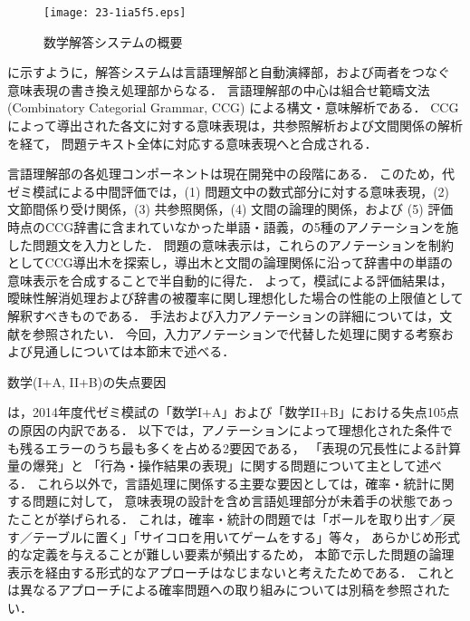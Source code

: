 \documentclass[japanese]{jnlp_1.4b}
\def\FIGREF#1{}
\def\TABREF#1{}
\begin{document}
\begin{figure}[b]
\begin{center}
\texttt{[image: 23-1ia5f5.eps]}
\end{center}
\caption{数学解答システムの概要\label{fig:mathoverview}}
\end{figure}

\FIGREF{fig:mathoverview}に示すように，解答システムは言語理解部と自動演繹部，および両者をつなぐ
意味表現の書き換え処理部からなる．
言語理解部の中心は組合せ範疇文法 (Combinatory Categorial Grammar, CCG) \cite{steedman2001syntactic,Bekki2010}による構文・意味解析である．
CCGによって導出された各文に対する意味表現は，共参照解析および文間関係の解析を経て，
問題テキスト全体に対応する意味表現へと合成される．

言語理解部の各処理コンポーネントは現在開発中の段階にある．
このため，代ゼミ模試による中間評価では，(1) 問題文中の数式部分に対する意味表現，(2) 文節間係り受け関係，(3) 共参照関係，(4) 文間の論理的関係，および (5) 評価時点のCCG辞書に含まれていなかった単語・語義，の5種のアノテーションを施した問題文を入力とした．
問題の意味表示は，これらのアノテーションを制約としてCCG導出木を探索し，導出木と文間の論理関係に沿って辞書中の単語の意味表示を合成することで半自動的に得た．
よって，模試による評価結果は，曖昧性解消処理および辞書の被覆率に関し理想化した場合の性能の上限値として解釈すべきものである．
手法および入力アノテーションの詳細については，文献\cite{Matsuzaki2013IJCNLP,Matsuzaki2014AAAI}を参照されたい．
今回，入力アノテーションで代替した処理に関する考察および見通しについては本節末で述べる．

\begin{table}[t]
\caption{数学(I+A, II+B)の失点要因}
\label{tab:suugaku:errortype}

\end{table}

\TABREF{tab:suugaku:errortype}は，2014年度代ゼミ模試の「数学I+A」および「数学II+B」における失点105点の原因の内訳である．
以下では，アノテーションによって理想化された条件でも残るエラーのうち最も多くを占める2要因である，
「表現の冗長性による計算量の爆発」と
「行為・操作結果の表現」に関する問題について主として述べる．
これら以外で，言語処理に関係する主要な要因としては，確率・統計に関する問題に対して，
意味表現の設計を含め言語処理部分が未着手の状態であったことが挙げられる．
これは，確率・統計の問題では「ボールを取り出す／戻す／テーブルに置く」「サイコロを用いてゲームをする」等々，
あらかじめ形式的な定義を与えることが難しい要素が頻出するため，
本節で示した問題の論理表示を経由する形式的なアプローチはなじまないと考えたためである．
これとは異なるアプローチによる確率問題への取り組みについては別稿\cite{Kamiya2015}を参照されたい．
\end{document}
